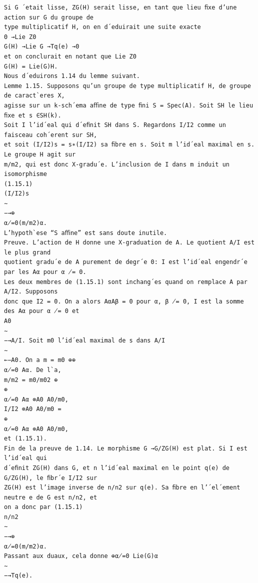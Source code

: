 \documentclass[10pt]{article}
\begin{document}
\begin{verbatim}
Si G ´etait lisse, ZG(H) serait lisse, en tant que lieu ﬁxe d’une action sur G du groupe de
type multiplicatif H, on en d´eduirait une suite exacte
0 →Lie Z0
G(H) →Lie G →Tq(e) →0
et on conclurait en notant que Lie Z0
G(H) = Lie(G)H.
Nous d´eduirons 1.14 du lemme suivant.
Lemme 1.15. Supposons qu’un groupe de type multiplicatif H, de groupe de caract`eres X,
agisse sur un k-sch´ema aﬃne de type ﬁni S = Spec(A). Soit SH le lieu ﬁxe et s ∈SH(k).
Soit I l’id´eal qui d´eﬁnit SH dans S. Regardons I/I2 comme un faisceau coh´erent sur SH,
et soit (I/I2)s = s∗(I/I2) sa ﬁbre en s. Soit m l’id´eal maximal en s. Le groupe H agit sur
m/m2, qui est donc X-gradu´e. L’inclusion de I dans m induit un isomorphisme
(1.15.1)
(I/I2)s
∼
−→⊕
α̸=0(m/m2)α.
L’hypoth`ese “S aﬃne” est sans doute inutile.
Preuve. L’action de H donne une X-graduation de A. Le quotient A/I est le plus grand
quotient gradu´e de A purement de degr´e 0: I est l’id´eal engendr´e par les Aα pour α ̸= 0.
Les deux membres de (1.15.1) sont inchang´es quand on remplace A par A/I2. Supposons
donc que I2 = 0. On a alors AαAβ = 0 pour α, β ̸= 0, I est la somme des Aα pour α ̸= 0 et
A0
∼
−→A/I. Soit m0 l’id´eal maximal de s dans A/I
∼
←−A0. On a m = m0 ⊕⊕
α̸=0 Aα. De l`a,
m/m2 = m0/m02 ⊕
⊕
α̸=0 Aα ⊗A0 A0/m0,
I/I2 ⊗A0 A0/m0 =
⊕
α̸=0 Aα ⊗A0 A0/m0,
et (1.15.1).
Fin de la preuve de 1.14. Le morphisme G →G/ZG(H) est plat. Si I est l’id´eal qui
d´eﬁnit ZG(H) dans G, et n l’id´eal maximal en le point q(e) de G/ZG(H), le ﬁbr´e I/I2 sur
ZG(H) est l’image inverse de n/n2 sur q(e). Sa ﬁbre en l’´el´ement neutre e de G est n/n2, et
on a donc par (1.15.1)
n/n2
∼
−→⊕
α̸=0(m/m2)α.
Passant aux duaux, cela donne ⊕α̸=0 Lie(G)α
∼
−→Tq(e).


\end{verbatim}
\end{document}
